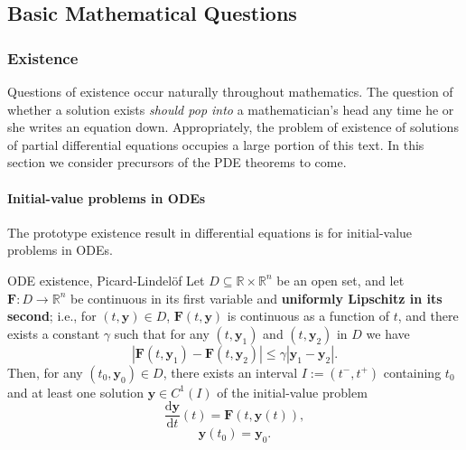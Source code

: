 \subsection{Basic Mathematical Questions}\label{sec:basic-mathematical-questions}

\subsubsection{Existence}\label{subsec:existence}

Questions of existence occur naturally throughout mathematics. The question of whether a solution exists \emph{should pop into} a mathematician's head any time he or she writes an equation down. Appropriately, the problem of existence of solutions of partial differential equations occupies a large portion of this text. In this section we consider precursors of the PDE theorems to come.

\paragraph*{Initial-value problems in ODEs}

The prototype existence result in differential equations is for initial-value problems in ODEs.

\begin{Theorem}{ODE existence, Picard-Lindelöf}
\label{thm:ode-existence}
Let $D\subseteq\mathbb{R}\times\mathbb{R}^n$ be an open set, and let $\bm{F}:D\to\mathbb{R}^n$ be continuous in its first variable and \textbf{uniformly Lipschitz in its second}; i.e., for $(t,\bm{y})\in D$, $\bm{F}(t,\bm{y})$ is continuous as a function of $t$, and there exists a constant $\gamma$ such that for any $(t,\bm{y}_1)$ and $(t,\bm{y}_2)$ in $D$ we have
\begin{equation}\label{eq:uniform-lipschitz-bound}
|\bm{F}(t,\bm{y}_1)-\bm{F}(t,\bm{y}_2)|\leq\gamma|\bm{y}_1-\bm{y}_2|.
\end{equation}
Then, for any $(t_0,\bm{y}_0)\in D$, there exists an interval $I:=(t^-,t^+)$ containing $t_0$ and at least one solution $\bm{y}\in C^1(I)$ of the initial-value problem
\begin{equation}\label{eq:ode-initial-value-dynamics}
\dfrac{\mathrm{d}\bm{y}}{\mathrm{d}t}(t)=\bm{F}(t,\bm{y}(t)),
\end{equation}
\begin{equation}\label{eq:ode-initial-value-data}
\bm{y}(t_0)=\bm{y}_0.
\end{equation}
\end{Theorem}

